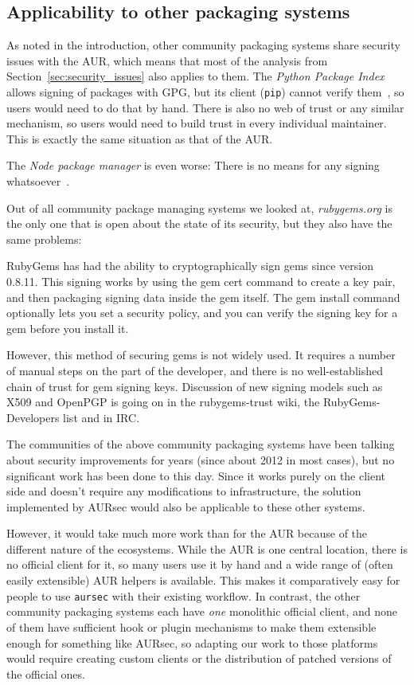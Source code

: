 \subsection{Applicability to other packaging systems} %
As noted in the introduction, other community packaging systems share security issues with the AUR, which means that most of the analysis from Section~\ref{sec:security_issues} also applies to them.
The \emph{Python Package Index} allows signing of packages with GPG, but its client (\texttt{pip}) cannot verify them~\cite{pypi:security}, so users would need to do that by hand.
There is also no web of trust or any similar mechanism, so users would need to build trust in every individual maintainer.
This is exactly the same situation as that of the AUR.

The \emph{Node package manager} is even worse: There is no means for any signing whatsoever~\cite{npm:security}.

Out of all community package managing systems we looked at, \emph{rubygems.org} is the only one that is open about the state of its security, but they also have the same problems:

\begin{displayquote}
RubyGems has had the ability to cryptographically sign gems since version 0.8.11. This signing works by using the gem cert command to create a key pair, and then packaging signing data inside the gem itself. The gem install command optionally lets you set a security policy, and you can verify the signing key for a gem before you install it.

However, this method of securing gems is not widely used. It requires a number of manual steps on the part of the developer, and there is no well-established chain of trust for gem signing keys. Discussion of new signing models such as X509 and OpenPGP is going on in the rubygems-trust wiki, the RubyGems-Developers list and in IRC.~\cite{rubygems:security}
\end{displayquote}

The communities of the above community packaging systems have been talking about security improvements for years (since about 2012 in most cases), but no significant work has been done to this day.
Since it works purely on the client side and doesn't require any modifications to infrastructure, the solution implemented by AURsec would also be applicable to these other systems.

However, it would take much more work than for the AUR because of the different nature of the ecosystems.
While the AUR is one central location, there is no official client for it, so many users use it by hand and a wide range of (often easily extensible) AUR helpers is available.
This makes it comparatively easy for people to use \texttt{aursec} with their existing workflow.
In contrast, the other community packaging systems each have \emph{one} monolithic official client, and none of them have sufficient hook or plugin mechanisms to make them extensible enough for something like AURsec, so adapting our work to those platforms would require creating custom clients or the distribution of patched versions of the official ones.
